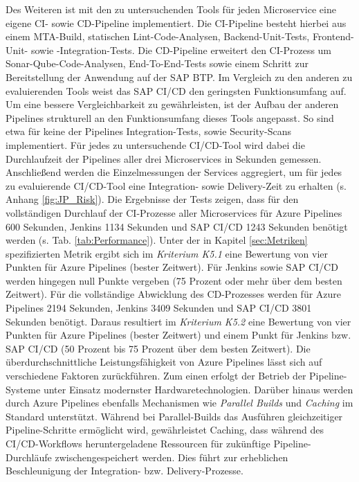  Des Weiteren ist mit den zu untersuchenden Tools für jeden Microservice eine eigene CI- sowie CD-Pipeline implementiert. Die CI-Pipeline besteht hierbei aus einem MTA-Build, statischen Lint-Code-Analysen, Backend-Unit-Tests, Frontend-Unit- sowie -Integration-Tests. Die CD-Pipeline erweitert den CI-Prozess um Sonar-Qube-Code-Analysen, End-To-End-Tests sowie einem Schritt zur Bereitstellung der Anwendung auf der SAP BTP. Im Vergleich zu den anderen zu evaluierenden Tools weist das SAP CI/CD den geringsten Funktionsumfang auf. Um eine bessere Vergleichbarkeit zu gewährleisten, ist der Aufbau der anderen Pipelines strukturell an den Funktionsumfang dieses Tools angepasst. So sind etwa für keine der Pipelines Integration-Tests, sowie Security-Scans implementiert. Für jedes zu untersuchende CI/CD-Tool wird dabei die Durchlaufzeit der Pipelines aller drei Microservices in Sekunden gemessen. Anschließend werden die Einzelmessungen der Services aggregiert, um für jedes zu evaluierende CI/CD-Tool eine Integration- sowie Delivery-Zeit zu erhalten (s. Anhang \ref{fig:JP_Risk}). Die Ergebnisse der Tests zeigen, dass für den vollständigen Durchlauf der CI-Prozesse aller Microservices für Azure Pipelines 600 Sekunden, Jenkins 1134 Sekunden und SAP CI/CD 1243 Sekunden benötigt werden (s. Tab. \ref{tab:Performance}). Unter der in Kapitel \ref{sec:Metriken} spezifizierten Metrik ergibt sich im \textit{Kriterium K5.1} eine Bewertung von vier Punkten für Azure Pipelines (bester Zeitwert). Für Jenkins sowie SAP CI/CD werden hingegen null Punkte vergeben (75 Prozent oder mehr über dem besten Zeitwert).  Für die vollständige Abwicklung des CD-Prozesses werden für Azure Pipelines 2194 Sekunden, Jenkins 3409 Sekunden und SAP CI/CD 3801 Sekunden benötigt. Daraus resultiert im \textit{Kriterium K5.2} eine Bewertung von vier Punkten für Azure Pipelines (bester Zeitwert) und einem Punkt für Jenkins bzw. SAP CI/CD (50 Prozent bis 75 Prozent über dem besten Zeitwert). Die überdurchschnittliche Leistungsfähigkeit von Azure Pipelines lässt sich auf verschiedene Faktoren zurückführen. Zum einen erfolgt der Betrieb der Pipeline-Systeme unter Einsatz modernster Hardwaretechnologien. Darüber hinaus werden durch Azure Pipelines ebenfalls Mechanismen wie \textit{Parallel Builds} und \textit{Caching} im Standard unterstützt. Während bei Parallel-Builds das Ausführen gleichzeitiger Pipeline-Schritte ermöglicht wird, gewährleistet Caching, dass während des CI/CD-Workflows heruntergeladene Ressourcen für zukünftige Pipeline-Durchläufe zwischengespeichert werden. Dies führt zur erheblichen Beschleunigung der Integration- bzw. Delivery-Prozesse.
